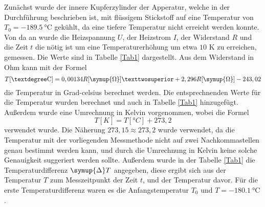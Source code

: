 
Zunächst wurde der innere Kupferzylinder der Apperatur, welche in der Durchführung beschrieben ist, mit 
flüssigem Stickstoff auf eine Temperatur von $T_0 = \SI{-189,5}{\celsius}$ gekühlt, da eine tiefere Temperatur 
nicht erreicht werden konnte. Von da an wurde die Heizspannung $U$, der Heizstrom $I$, der Widerstand $R$ 
und die Zeit $t$ die nötig ist um eine Temperaturerhöhung um etwa $10$ K zu erreichen, gemessen. Die Werte sind in Tabelle \ref{Tab1} 
dargestellt. Aus dem Widerstand in Ohm kann mit der Formel 
\begin{equation*}
    T[\si{°C}] = 0,00134 R[\symup{\Omega}]² + 2,296 R[\symup{\Omega}] -243,02
\end{equation*}
die Temperatur in Grad-celsius berechnet werden. Die entsprechnenden Werte für die Temperatur wurden 
berechnet und auch in Tabelle \ref{Tab1} hinzugefügt. Außerdem wurde eine Umrechnung in Kelvin vorgenommen, 
wobei die Formel 
\begin{equation*}
    T[\si{K}] = T[\si{°C}] + 273,2
\end{equation*}
verwendet wurde. Die Näherung $273,15 \approx 273,2$ wurde verwendet, da die Temperatur mit der vorliegenden 
Messmethode nicht auf zwei Nachkommastellen genau bestimmt werden kann, und durch die Umrechnung in Kelvin 
keine solche Genauigkeit suggeriert werden sollte. 
Außerdem wurde in der Tabelle \ref{Tab1} die Temperaturdifferenz $\symup{\Delta}T$ angegeben, diese ergibt 
sich aus der Temperatur $T$ zum Messzeitpunkt der Zeit $t$, und der Temperatur davor. Für die erste 
Temperaturdifferenz waren es die Anfangstemperatur $T_0$ und $T=\SI{-180,1}{\celsius}$. 

